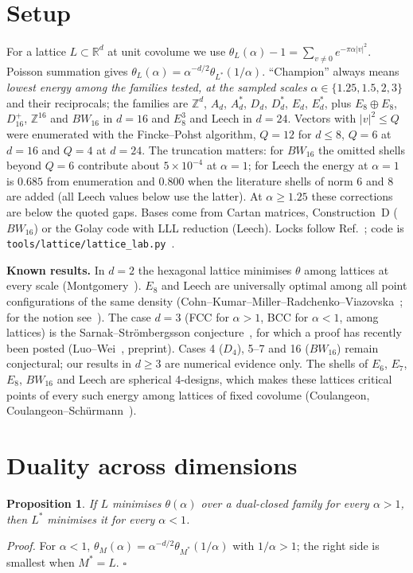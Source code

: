 \documentclass[aps,prd,twocolumn,superscriptaddress,nofootinbib,showkeys]{revtex4-2}
\newtheorem{prop}{Proposition}
\begin{document}
\section{Setup}
For a lattice $L\subset\mathbb R^d$ at unit covolume we use $\theta_L(\alpha)-1=\sum_{v\ne0}e^{-\pi\alpha|v|^2}$. Poisson summation gives $\theta_L(\alpha)=\alpha^{-d/2}\theta_{L^*}(1/\alpha)$. ``Champion'' always means \emph{lowest energy among the families tested, at the sampled scales} $\alpha\in\{1.25,1.5,2,3\}$ and their reciprocals; the families are $\mathbb Z^d$, $A_d$, $A_d^*$, $D_d$, $D_d^*$, $E_d$, $E_d^*$, plus $E_8\oplus E_8$, $D_{16}^+$, $\mathbb Z^{16}$ and $BW_{16}$ in $d=16$ and $E_8^3$ and Leech in $d=24$. Vectors with $|v|^2\le Q$ were enumerated with the Fincke--Pohst algorithm, $Q=12$ for $d\le8$, $Q=6$ at $d=16$ and $Q=4$ at $d=24$. The truncation matters: for $BW_{16}$ the omitted shells beyond $Q=6$ contribute about $5\times10^{-4}$ at $\alpha=1$; for Leech the energy at $\alpha=1$ is $0.685$ from enumeration and $0.800$ when the literature shells of norm 6 and 8~\cite{CS} are added (all Leech values below use the latter). At $\alpha\ge1.25$ these corrections are below the quoted gaps. Bases come from Cartan matrices, Construction~D ($BW_{16}$) or the Golay code with LLL reduction (Leech). Locks follow Ref.~\cite{P4}; code is \texttt{tools/lattice/lattice\_lab.py}~\cite{AEGIS}.

\textbf{Known results.} In $d=2$ the hexagonal lattice minimises $\theta$ among lattices at every scale (Montgomery~\cite{Mon}). $E_8$ and Leech are universally optimal among all point configurations of the same density (Cohn--Kumar--Miller--Radchenko--Viazovska~\cite{CKMRV}; for the notion see~\cite{CK}). The case $d=3$ (FCC for $\alpha>1$, BCC for $\alpha<1$, among lattices) is the Sarnak--Str\"ombergsson conjecture~\cite{SS}, for which a proof has recently been posted (Luo--Wei~\cite{LW}, preprint). Cases 4 ($D_4$), 5--7 and 16 ($BW_{16}$) remain conjectural; our results in $d\ge3$ are numerical evidence only. The shells of $E_6$, $E_7$, $E_8$, $BW_{16}$ and Leech are spherical 4-designs, which makes these lattices critical points of every such energy among lattices of fixed covolume (Coulangeon, Coulangeon--Sch\"urmann~\cite{Cou,CoSc}).

\section{Duality across dimensions}
\begin{prop} If $L$ minimises $\theta(\alpha)$ over a dual-closed family for every $\alpha>1$, then $L^*$ minimises it for every $\alpha<1$.\end{prop}
\emph{Proof.} For $\alpha<1$, $\theta_M(\alpha)=\alpha^{-d/2}\theta_{M^*}(1/\alpha)$ with $1/\alpha>1$; the right side is smallest when $M^*=L$. $\square$
\end{document}

